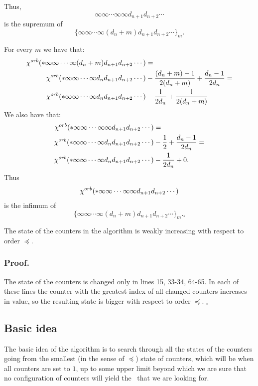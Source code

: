 Thus, 
\begin{equation}
\infty\infty\cdots\infty \infty d_{n+1} d_{n+2}\cdots
\end{equation} 
is the supremum of 
\begin{equation}
\{\infty\infty\cdots\infty (d_n+m) d_{n+1} d_{n+2}\cdots\}_m.
\end{equation}

For every $m$ we have that: 
\begin{align}
{\chi^{orb}(*\infty\infty\cdots\infty (d_n+m) d_{n+1} d_{n+2}\cdots)} &= \\ 
{\chi^{orb}(*\infty\infty\cdots\infty d_n d_{n+1} d_{n+2}\cdots)} 
&- \frac{(d_n+m)-1}{2(d_n+m)} + \frac{d_n-1}{2d_n} = \notag \\ 
{\chi^{orb}(*\infty\infty\cdots\infty d_n d_{n+1} d_{n+2}\cdots)} &- 
\frac{1}{2d_n} + \frac{1}{2(d_n+m)}
\end{align}
We also have that:
\begin{align}
{\chi^{orb}(*\infty\infty\cdots\infty \infty d_{n+1} d_{n+2}\cdots)} &= \\
{\chi^{orb}(*\infty\infty\cdots\infty d_n d_{n+1} d_{n+2}\cdots)} 
&- \frac{1}{2} + \frac{d_n-1}{2d_n} = \notag \\ 
{\chi^{orb}(*\infty\infty\cdots\infty d_n d_{n+1} d_{n+2}\cdots)} &- \frac{1}{2d_n} + 0.
\end{align}
Thus 
\begin{equation}
{\chi^{orb}(*\infty\infty\cdots\infty \infty d_{n+1} d_{n+2}\cdots)}
\end{equation} 
is the infimum of 
\begin{equation}
\{\infty\infty\cdots\infty (d_n+m) d_{n+1} d_{n+2}\cdots\}_m. _\square
\end{equation}
\begin{lemma}
The state of the counters in the algorithm is weakly increasing with respect to order $\preceq$. 
\end{lemma}
\subsubsection{Proof.}
The state of the counters is changed only in lines 15, 33-34, 64-65. In each of these lines 
the counter with the greatest index of all changed counters increases in value, so 
the resulting state is bigger with respect to order $\preceq$. $_\square$

\subsection{Basic idea}\label{basic idea}
The basic idea of the algorithm is to search through all the states of the counters going 
from the smallest (in the sense of $\preceq$) state of counters, which will be when all counters 
are set to $1$, up to some upper limit beyond which we are sure that no configuration of 
counters will yield the \Eoc\ that we are looking for. 

